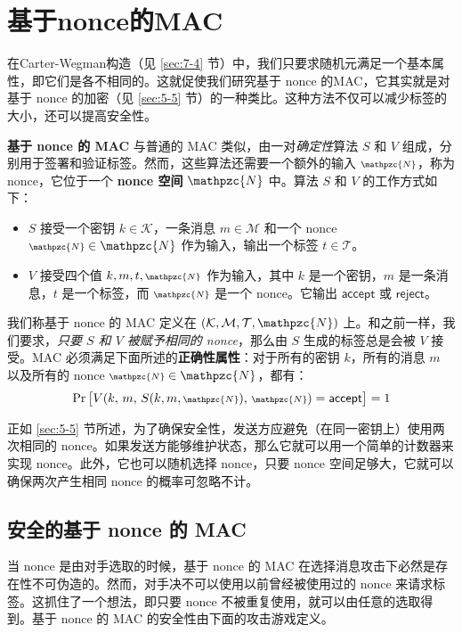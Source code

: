 \section{基于nonce的MAC}\label{sec:7-5}

在Carter-Wegman构造（见 \ref{sec:7-4} 节）中，我们只要求随机元满足一个基本属性，即它们是各不相同的。这就促使我们研究基于 nonce 的MAC，它其实就是对基于 nonce 的加密（见 \ref{sec:5-5} 节）的一种类比。这种方法不仅可以减少标签的大小，还可以提高安全性。

\textbf{基于 nonce 的 MAC} 与普通的 MAC 类似，由一对\emph{确定性}算法 $S$ 和 $V$ 组成，分别用于签署和验证标签。然而，这些算法还需要一个额外的输入 ${\scriptstyle\mathpzc{N}}$，称为 nonce，它位于一个 \textbf{nonce 空间} $\mathpzc{N}$ 中。算法 $S$ 和 $V$ 的工作方式如下：
\begin{itemize}
	\item $S$ 接受一个密钥 $k\in\mathcal{K}$，一条消息 $m\in\mathcal{M}$ 和一个 nonce ${\scriptstyle\mathpzc{N}}\in\mathpzc{N}$ 作为输入，输出一个标签 $t\in\mathcal{T}$。
	\item $V$ 接受四个值 $k,m,t,{\scriptstyle\mathpzc{N}}$ 作为输入，其中 $k$ 是一个密钥，$m$ 是一条消息，$t$ 是一个标签，而 ${\scriptstyle\mathpzc{N}}$ 是一个 nonce。它输出 $\mathsf{accept}$ 或 $\mathsf{reject}$。
\end{itemize}
我们称基于 nonce 的 MAC 定义在 $(\mathcal{K},\mathcal{M},\mathcal{T},\mathpzc{N})$ 上。和之前一样，我们要求，\emph{只要 $S$ 和 $V$ 被赋予相同的 nonce}，那么由 $S$ 生成的标签总是会被 $V$ 接受。MAC 必须满足下面所述的\textbf{正确性属性}：对于所有的密钥 $k$，所有的消息 $m$ 以及所有的 nonce ${\scriptstyle\mathpzc{N}}\in\mathpzc{N}$，都有：
\[
\Pr\big[
V(k,\,m,\,S(k,m,{\scriptstyle\mathpzc{N}}),\,{\scriptstyle\mathpzc{N}})=\mathsf{accept}
\big]
=1
\]

正如 \ref{sec:5-5} 节所述，为了确保安全性，发送方应避免（在同一密钥上）使用两次相同的 nonce。如果发送方能够维护状态，那么它就可以用一个简单的计数器来实现 nonce。此外，它也可以随机选择 nonce，只要 nonce 空间足够大，它就可以确保两次产生相同 nonce 的概率可忽略不计。

\subsection{安全的基于 nonce 的 MAC}\label{subsec:7-5-1}

当 nonce 是由对手选取的时候，基于 nonce 的 MAC 在选择消息攻击下必然是存在性不可伪造的。然而，对手决不可以使用以前曾经被使用过的 nonce 来请求标签。这抓住了一个想法，即只要 nonce 不被重复使用，就可以由任意的选取得到。基于 nonce 的 MAC 的安全性由下面的攻击游戏定义。

